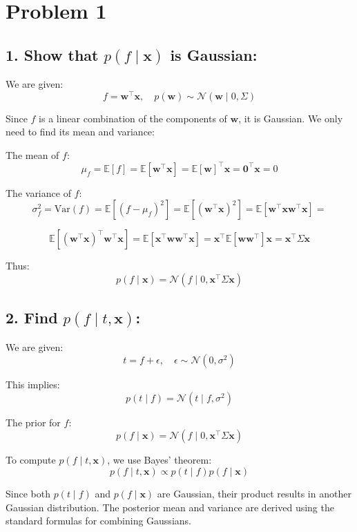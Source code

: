 \documentclass{article}
\begin{document}


\section*{Problem 1}

\subsection*{1. Show that \( p(f \mid \mathbf{x}) \) is Gaussian:}

We are given:
\[
f = \mathbf{w}^\top \mathbf{x}, \quad p(\mathbf{w}) \sim \mathcal{N}(\mathbf{w} \mid 0, \Sigma)
\]

Since \( f \) is a linear combination of the components of \( \mathbf{w} \), it is Gaussian. 
We only need to find its mean and variance:

The mean of \( f \):
\[
\mu_f = \mathbb{E}[f] = \mathbb{E}[\mathbf{w}^\top \mathbf{x}] = \mathbb{E}[\mathbf{w}]^\top \mathbf{x} = \mathbf{0}^\top \mathbf{x} = 0
\]

The variance of \( f \):
\[
\sigma_f^2 = \text{Var}(f) = \mathbb{E}[(f - \mu_f)^2] = \mathbb{E}[(\mathbf{w}^\top \mathbf{x})^2] 
= \mathbb{E}[\mathbf{w}^\top \mathbf{x}\mathbf{w}^\top \mathbf{x}] =
\]

\[
  \mathbb{E}[(\mathbf{w}^\top \mathbf{x})^\top \mathbf{w}^\top \mathbf{x}]
= \mathbb{E}[ \mathbf{x}^\top \mathbf{w} \mathbf{w}^\top \mathbf{x}]
= \mathbf{x}^\top \mathbb{E}[  \mathbf{w} \mathbf{w}^\top ] \mathbf{x}
= \mathbf{x}^\top \Sigma \mathbf{x}
\]

Thus:
\[
p(f \mid \mathbf{x}) = \mathcal{N}(f \mid 0, \mathbf{x}^\top \Sigma \mathbf{x})
\]


\subsection*{2. Find \( p(f \mid t, \mathbf{x}) \):}

We are given:
\[
t = f + \epsilon, \quad \epsilon \sim \mathcal{N}(0, \sigma^2)
\]

This implies:
\[
p(t \mid f) = \mathcal{N}(t \mid f, \sigma^2)
\]

The prior for \( f \):
\[
p(f \mid \mathbf{x}) = \mathcal{N}(f \mid 0, \mathbf{x}^\top \Sigma \mathbf{x})
\]

To compute \( p(f \mid t, \mathbf{x}) \), we use Bayes' theorem:
\[
p(f \mid t, \mathbf{x}) \propto p(t \mid f) p(f \mid \mathbf{x})
\]

Since both \( p(t \mid f) \) and \( p(f \mid \mathbf{x}) \) are Gaussian, their product results in another Gaussian distribution. The posterior mean and variance are derived using the standard formulas for combining Gaussians.
\end{document}
